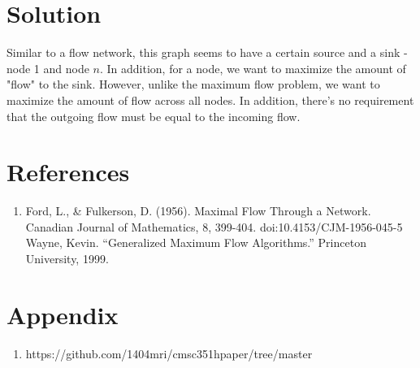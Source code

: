 \documentclass[11pt]{article}
\begin{document}
\section{Solution}
Similar to a flow network, this graph seems to have a certain source and a sink - node 1 and node $n$. In addition, for a node, we want to maximize the amount of "flow" to the sink. However, unlike the maximum flow problem, we want to maximize the amount of flow across all nodes. In addition, there's no requirement that the outgoing flow must be equal to the incoming flow.

\section{References}
\begin{enumerate}
	\item 
Ford, L., \& Fulkerson, D. (1956). Maximal Flow Through a Network. Canadian Journal of Mathematics, 8, 399-404. doi:10.4153/CJM-1956-045-5
Wayne, Kevin. “Generalized Maximum Flow Algorithms.” Princeton University, 1999. 
\end{enumerate}
\section{Appendix}
\begin{enumerate}
	\item https://github.com/1404mri/cmsc351hpaper/tree/master
\end{enumerate}
\end{document}
